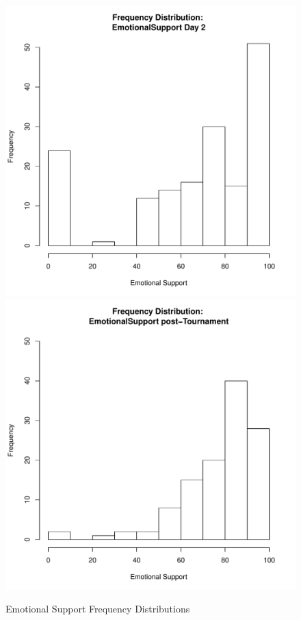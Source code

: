 \documentclass[12pt]{report}
\begin{document}
{\begin{figure}[htbp]
  \includegraphics[scale =.4]{../images/distEmotionalSupportDay2.pdf}
  \includegraphics[scale =.4]{../images/distEmotionalSupportPost.pdf}
  \caption{Emotional Support Frequency Distributions}
  \label{fig:emotionalSupportDist}
\end{figure}


}
\end{document}
